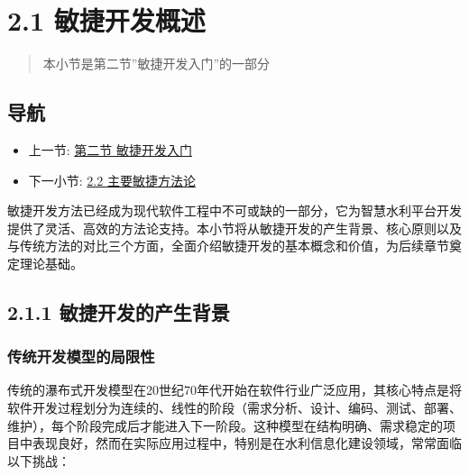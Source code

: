 \section{2.1 敏捷开发概述}\label{ux654fux6377ux5f00ux53d1ux6982ux8ff0}

\begin{quote}
本小节是第二节''敏捷开发入门''的一部分
\end{quote}

\subsection{导航}\label{ux5bfcux822a}

\begin{itemize}
\tightlist
\item
  上一节: \href{section03-02.md}{第二节 敏捷开发入门}
\item
  下一小节: \href{section03-02-02.md}{2.2 主要敏捷方法论}
\end{itemize}

敏捷开发方法已经成为现代软件工程中不可或缺的一部分，它为智慧水利平台开发提供了灵活、高效的方法论支持。本小节将从敏捷开发的产生背景、核心原则以及与传统方法的对比三个方面，全面介绍敏捷开发的基本概念和价值，为后续章节奠定理论基础。

\subsection{2.1.1
敏捷开发的产生背景}\label{ux654fux6377ux5f00ux53d1ux7684ux4ea7ux751fux80ccux666f}

\subsubsection{传统开发模型的局限性}\label{ux4f20ux7edfux5f00ux53d1ux6a21ux578bux7684ux5c40ux9650ux6027}

传统的瀑布式开发模型在20世纪70年代开始在软件行业广泛应用，其核心特点是将软件开发过程划分为连续的、线性的阶段（需求分析、设计、编码、测试、部署、维护），每个阶段完成后才能进入下一阶段。这种模型在结构明确、需求稳定的项目中表现良好，然而在实际应用过程中，特别是在水利信息化建设领域，常常面临以下挑战：

